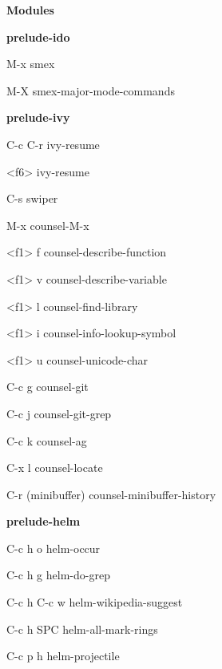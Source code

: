 \documentclass[10pt]{article}
\renewcommand\section[1]{\bigskip\par\textbf{\color{heading}\large#1}\smallskip}
\renewcommand\subsection[1]{\smallskip\par\textbf{\color{heading}#1}}
\begin{document}
\begin{multicols}{4}
  \section{Modules}
  \subsection{prelude-ido}
  \begin{keylist}
  \item[M-x] smex
  \item[M-X] smex-major-mode-commands
  \end{keylist}

  \subsection{prelude-ivy}
  \begin{keylist}
  \item[C-c C-r] ivy-resume
  \item[<f6>] ivy-resume
  \item[C-s] swiper
  \item[M-x] counsel-M-x
  \item[<f1> f] counsel-describe-function
  \item[<f1> v] counsel-describe-variable
  \item[<f1> l] counsel-find-library
  \item[<f1> i] counsel-info-lookup-symbol
  \item[<f1> u] counsel-unicode-char
  \item[C-c g] counsel-git
  \item[C-c j] counsel-git-grep
  \item[C-c k] counsel-ag
  \item[C-x l] counsel-locate
  \item[C-r] (minibuffer) counsel-minibuffer-history
  \end{keylist}

  \subsection{prelude-helm}
  \begin{keylist}
  \item[C-c h o] helm-occur
  \item[C-c h g] helm-do-grep
  \item[C-c h C-c w] helm-wikipedia-suggest
  \item[C-c h SPC] helm-all-mark-rings
  \item[C-c p h] helm-projectile
  \end{keylist}


\end{multicols}
\end{document}
